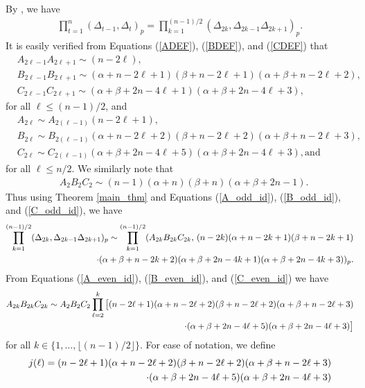 \documentclass{amsart}
\theoremstyle{plain}
\theoremstyle{remark}
\begin{document}
By \cite[Equation (6)]{hajir}, we have
\begin{align} \label{delta_2k}
\prod_{t=1}^n (\Delta_{t-1},\Delta_{t})_p = \prod_{k=1}^{(n-1)/2} (\Delta_{2k},\Delta_{2k-1}\Delta_{2k+1})_p.
\end{align}
It is easily verified from Equations (\ref{ADEF}), (\ref{BDEF}), and (\ref{CDEF}) that
\begin{align}
&A_{2\ell-1}A_{2\ell+1}\sim(n-2\ell),\label{A_odd_id}\\ 
&B_{2\ell-1}B_{2\ell+1}\sim(\alpha+n-2\ell+1)(\beta+n-2\ell+1)(\alpha+\beta+n-2\ell+2),\label{B_odd_id}\\ 
&C_{2\ell-1}C_{2\ell+1}\sim(\alpha+\beta+2n-4\ell+1)(\alpha+\beta+2n-4\ell+3),\label{C_odd_id}
\end{align}
for all $\ell\le (n-1)/2$, and
\begin{align}    
&A_{2\ell}\sim A_{2(\ell-1)}(n-2\ell+1), \label{A_even_id}\\
&B_{2\ell}\sim B_{2(\ell-1)}(\alpha+n-2\ell+2)(\beta+n-2\ell+2)(\alpha+\beta+n-2\ell+3), \label{B_even_id} \\
&C_{2\ell}\sim C_{2(\ell-1)}(\alpha+\beta+2n-4\ell+5)(\alpha+\beta+2n-4\ell+3),\text{and} \label{C_even_id}
\end{align}
for all $\ell\le n/2$. We similarly note that 
\begin{align}
&A_2B_2C_2\sim (n-1)(\alpha+n)(\beta+n)(\alpha+\beta+2n-1). \label{A2B2C2}
\end{align}
Thus using Theorem \ref{main_thm} and Equations (\ref{A_odd_id}), (\ref{B_odd_id}), and (\ref{C_odd_id}), we have
\begin{align} \label{delta_2k_with_ABC}
    \prod_{k=1}^{(n-1)/2} (\Delta_{2k},\Delta_{2k-1}\Delta_{2k+1})_p\sim  \prod_{k=1}^{(n-1)/2}(A_{2k}B_{2k}C_{2k},\,(n-2k)(\alpha+n-2k+1)(\beta+n-2k+1) \notag
    \\\cdot(\alpha+\beta+n-2k+2)(\alpha+\beta+2n-4k+1)(\alpha+\beta+2n-4k+3))_p. 
\end{align}
From Equations (\ref{A_even_id}), (\ref{B_even_id}), and (\ref{C_even_id}) we have
\begin{align} \label{A2kB2kC2k}
    A_{2k}B_{2k}C_{2k}\sim A_2B_2C_2\prod_{\ell=2}^k\big[(n-2\ell+1)(\alpha+n-2\ell+2)(\beta+n-2\ell+2)(\alpha+\beta+n-2\ell+3) \notag
    \\\cdot(\alpha+\beta+2n-4\ell+5)(\alpha+\beta+2n-4\ell+3) \big]
\end{align}
for all $k\in\{1,\ldots,\lfloor(n-1)/2\rfloor\}$. For ease of notation, we define
\begin{align} \label{j(ell)}
    j(\ell)=(n-2\ell+1)(\alpha+n-2\ell+2)(\beta+n-2\ell+2)(\alpha+\beta+n-2\ell+3)
    \\\cdot(\alpha+\beta+2n-4\ell+5)(\alpha+\beta+2n-4\ell+3) \notag
\end{align}
\end{document}
